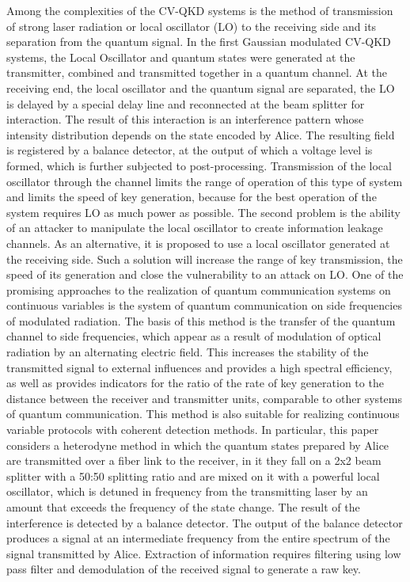 Among the complexities of the CV-QKD systems is the method of transmission of strong laser radiation or local oscillator (LO) to the receiving side and its separation from the quantum signal. In the first Gaussian modulated CV-QKD systems, the Local Oscillator and quantum states were generated at the transmitter, combined and transmitted together in a quantum channel. At the receiving end, the local oscillator and the quantum signal are separated, the LO is delayed by a special delay line and reconnected at the beam splitter for interaction. The result of this interaction is an interference pattern whose intensity distribution depends on the state encoded by Alice. The resulting field is registered by a balance detector, at the output of which a voltage level is formed, which is further subjected to post-processing.  Transmission of the local oscillator through the channel limits the range of operation of this type of system and limits the speed of key generation, because for the best operation of the system requires LO as much power as possible. The second problem is the ability of an attacker to manipulate the local oscillator to create information leakage channels. As an alternative, it is proposed to use a local oscillator generated at the receiving side. Such a solution will increase the range of key transmission, the speed of its generation and close the vulnerability to an attack on LO.
One of the promising approaches to the realization of quantum communication systems on continuous variables is the system of quantum communication on side frequencies of modulated radiation. The basis of this method is the transfer of the quantum channel to side frequencies, which appear as a result of modulation of optical radiation by an alternating electric field. This increases the stability of the transmitted signal to external influences and provides a high spectral efficiency, as well as provides indicators for the ratio of the rate of key generation to the distance between the receiver and transmitter units, comparable to other systems of quantum communication. This method is also suitable for realizing continuous variable protocols with coherent detection methods. In particular, this paper considers a heterodyne method in which the quantum states prepared by Alice are transmitted over a fiber link to the receiver, in it they fall on a 2x2 beam splitter with a 50:50 splitting ratio and are mixed on it with a powerful local oscillator, which is detuned in frequency from the transmitting laser by an amount that exceeds the frequency of the state change. The result of the interference is detected by a balance detector. The output of the balance detector produces a signal at an intermediate frequency from the entire spectrum of the signal transmitted by Alice. Extraction of information requires filtering using low pass filter and demodulation of the received signal to generate a raw key. 

